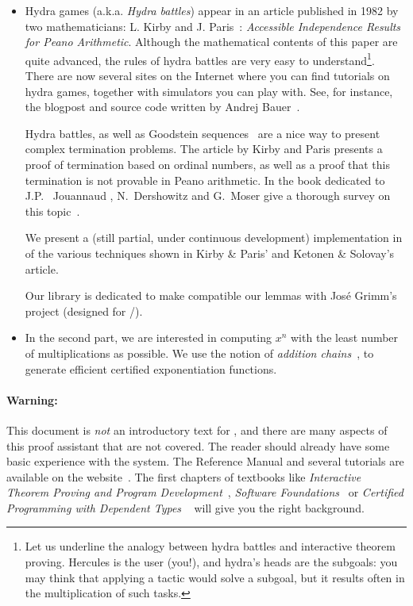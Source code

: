 \documentclass[twoside,a4paper]{book}
\begin{document}
\begin{itemize}
\item Hydra games (a.k.a. \emph{Hydra battles}) appear in an article published in 1982 by two mathematicians:
L. Kirby and J. Paris~\cite{KP82}: \emph{Accessible Independence Results for Peano Arithmetic}. 
Although the mathematical contents of this 
paper are quite advanced, the rules of hydra battles are very easy to understand\footnote{Let us underline the analogy between hydra battles and interactive theorem proving. Hercules is the user (you!), and hydra's heads are the subgoals: you may think that applying a tactic would solve a subgoal, but it results often in the multiplication of such tasks.}.
There are now several sites on the Internet where you can find tutorials on hydra games, together with simulators you can play with. See, for instance, the blogpost and source code written by Andrej Bauer~\cite{bauer2008,BauerHydra}.




Hydra battles, as well as Goodstein sequences~\cite{goodstein_1944, KP82}
are a nice way to present complex termination problems.
The article by Kirby and Paris presents a proof of termination
based on ordinal numbers, as well as a proof that this termination is not
provable in Peano arithmetic. In the book dedicated to 
J.P. ~Jouannaud \cite{HommageJPJ}, N.~Dershowitz and G.~Moser  give a thorough survey on this topic~\cite{Dershowitz2007}.

We present a (still partial, under continuous development) implementation in \coq of the various techniques shown in
Kirby \& Paris' and Ketonen \& Solovay's~\cite{KS81} article.

Our library \gaiaHydras is dedicated to make compatible our lemmas with José Grimm's \gaia project (designed for \ssreflect/\mathcomp).


\item In the second part, we are interested in computing $x^n$ with the least number of multiplications as possible. We use the notion of \emph{addition chains}~\cite{brauer1939,DBLP:journals/ipl/BerstelB87}, to generate efficient certified exponentiation functions.
\end{itemize}

\paragraph*{Warning:}

This document is \emph{not} an introductory text for \coq, and there are many aspects of this proof assistant that are not covered. 
 The reader should already have some basic experience with the \coq system. The Reference Manual and several tutorials are available on the \coq website~\cite{Coq}. The first chapters of textbooks like \emph{Interactive Theorem Proving and Program Development}~\cite{BC04}, \emph{Software Foundations}~\cite{SF} or  \emph{Certified Programming with Dependent Types} ~\cite{chlipalacpdt2011} will give you the right background.
\end{document}
